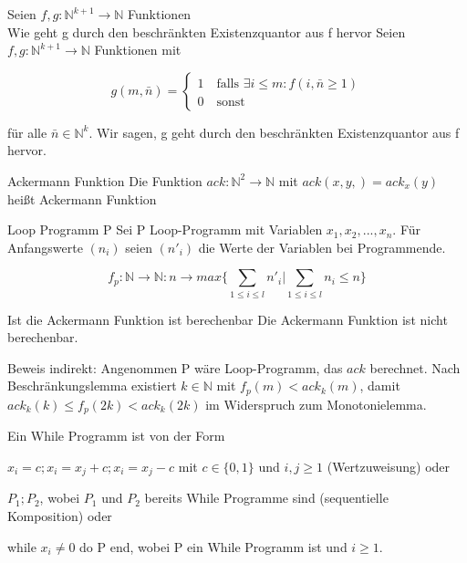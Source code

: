 \documentclass[avery5371, frame]{flashcards}
\begin{document}
\begin{flashcard}[Definition]{Seien $f,g: \mathbb{N}^{k+1}\rightarrow\mathbb{N}$ Funktionen\\ Wie geht g durch den beschränkten Existenzquantor aus f hervor}
    Seien $f,g: \mathbb{N}^{k+1}\rightarrow\mathbb{N}$ Funktionen mit
    \begin{itemize*}
        \item $$g(m,\bar{n})= \begin{cases} 1 \quad\text{falls } \exists i\leq m: f(i,\bar{n}\geq 1) \\ 0 \quad\text{sonst} \end{cases}$$
        \item für alle $\bar{n}\in\mathbb{N}^k$. Wir sagen, g geht durch den beschränkten Existenzquantor aus f hervor.
    \end{itemize*}
\end{flashcard}

\begin{flashcard}[Definition]{Ackermann Funktion}
    Die Funktion $ack:\mathbb{N}^2\rightarrow\mathbb{N}$ mit $ack(x,y,)=ack_x(y)$ heißt Ackermann Funktion
\end{flashcard}

\begin{flashcard}[Definition]{Loop Programm P}
    Sei P Loop-Programm mit Variablen $x_1,x_2,...,x_n$. Für Anfangswerte $(n_i)$ seien $(n'_i)$ die Werte der Variablen bei Programmende.

    $$f_p:\mathbb{N}\rightarrow\mathbb{N}: n\rightarrow max\{\sum_{1\leq i\leq l} n'_i | \sum_{1\leq i \leq l} n_i\leq n \}$$
\end{flashcard}

\begin{flashcard}[Satz]{Ist die Ackermann Funktion ist berechenbar}
    Die Ackermann Funktion ist nicht berechenbar.

    Beweis indirekt: Angenommen P wäre Loop-Programm, das $ack$ berechnet. Nach Beschränkungslemma existiert $k\in\mathbb{N}$ mit $f_p(m)< ack_k(m)$, damit $ack_k(k)\leq f_p(2k)< ack_k(2k)$ im Widerspruch zum Monotonielemma.
\end{flashcard}

\begin{flashcard}[Definition]{ Ein While Programm ist von der Form}
    \begin{itemize*}
        \item $x_i=c; x_i=x_j+c; x_i=x_j-c$ mit $c\in\{0,1\}$ und $i,j\geq 1$ (Wertzuweisung) oder
        \item $P_1;P_2$, wobei $P_1$ und $P_2$ bereits While Programme sind (sequentielle Komposition) oder
        \item while $x_i\not = 0$ do P end, wobei P ein While Programm ist und $i\geq 1$.
    \end{itemize*}
\end{flashcard}
\end{document}
